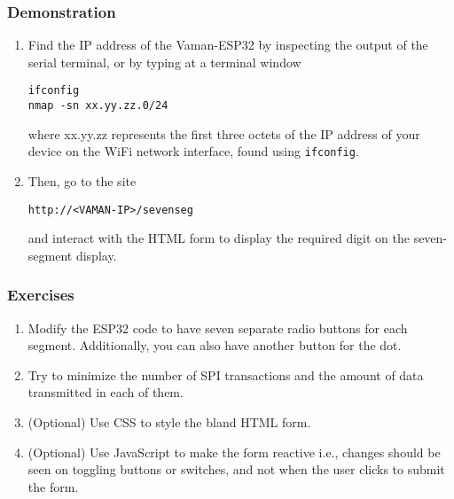 \subsubsection{Demonstration}
\begin{enumerate}
    \item Find the IP address of the Vaman-ESP32 by inspecting the output of the
    serial terminal, or by typing at a terminal window
    \begin{lstlisting}
ifconfig
nmap -sn xx.yy.zz.0/24
    \end{lstlisting}
    where xx.yy.zz represents the first three octets of the IP address of your
    device on the WiFi network interface, found using \texttt{ifconfig}.
    \item Then, go to the site
    \begin{lstlisting}
http://<VAMAN-IP>/sevenseg
    \end{lstlisting}
    and interact with the HTML form to display the required digit on the
    seven-segment display.
\end{enumerate}

\subsubsection{Exercises}
\begin{enumerate}
    \item Modify the ESP32 code to have seven separate radio buttons for each
    segment. Additionally, you can also have another button for the dot.
    \item Try to minimize the number of SPI transactions and the amount of data
    transmitted in each of them.
    \item (Optional) Use CSS to style the bland HTML form.
    \item (Optional) Use JavaScript to make the form reactive i.e., changes
    should be seen on toggling buttons or switches, and not when the user clicks
    to submit the form.
\end{enumerate}